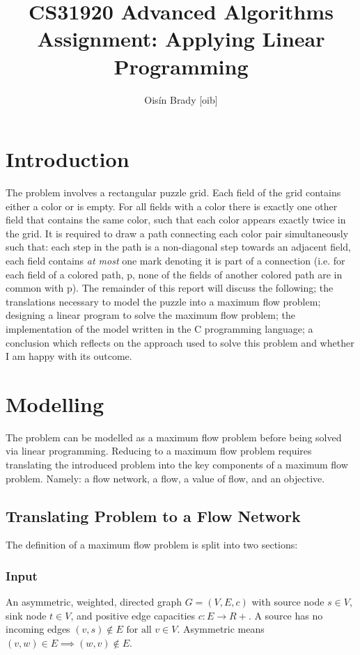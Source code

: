 \documentclass{homeworg}
\title{CS31920 Advanced Algorithms Assignment: Applying Linear Programming }
\author{Oisín Brady [oib]}
\begin{document}
\maketitle

\section{Introduction}
The problem involves a rectangular puzzle grid. Each field of the grid contains either a color or is empty. For all fields with a color there is exactly one other field that contains the same color, such that each color appears exactly twice in the grid. It is required to draw a path connecting each color pair simultaneously such that: each step in the path is a non-diagonal step towards an adjacent field, each field contains \textit{at most} one mark denoting it is part of a connection (i.e. for each field of a colored path, p, none of the fields of another colored path are in common with p). The remainder of this report will discuss the following; the translations necessary to model the puzzle into a maximum flow problem; designing a linear program to solve the maximum flow problem; the implementation of the model written in the C programming language; a conclusion which reflects on the approach used to solve this problem and whether I am happy with its outcome.

\section{Modelling}
The problem can be modelled as a maximum flow problem before being solved via linear programming.
Reducing to a maximum flow problem requires translating the introduced problem into the key components of a maximum flow problem. Namely: a flow network, a flow, a value of flow, and an objective. 
\subsection{Translating Problem to a Flow Network}
The definition of a maximum flow problem is split into two sections:
\subsubsection{Input}
An asymmetric, weighted, directed graph \(G = (V, E, c)\) with source node \(s \in V\), sink node \(t \in V\), and positive edge capacities \(c:E\rightarrow R+\). A source has no incoming edges \((v,s) \notin E \text{ for all } v \in V\). Asymmetric means \((v,w) \in E \implies (w,v) \notin E\). 
\end{document}
